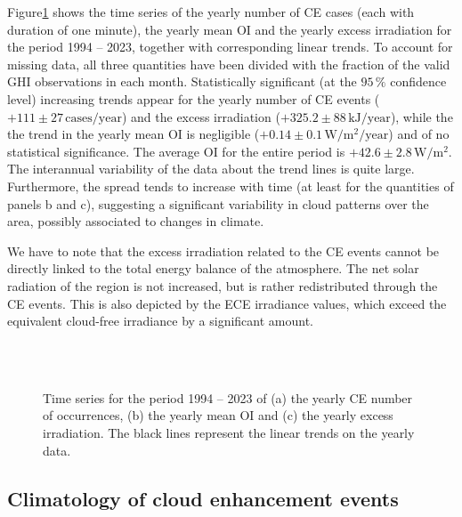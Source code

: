 \documentclass[preprint, 5p,
authoryear]{elsarticle} %
\begin{document}
Figure\nobreakspace{}\ref{fig:P-energy} shows the time series of the
yearly number of CE cases (each with duration of one minute), the yearly
mean OI and the yearly excess irradiation for the period 1994 -- 2023,
together with corresponding linear trends. To account for missing data,
all three quantities have been divided with the fraction of the valid
GHI observations in each month. Statistically significant (at the
\(95\,\%\) confidence level) increasing trends appear for the yearly
number of CE events (\(+111\pm 27\,\text{cases}/\text{year}\)) and the
excess irradiation (\(+325.2 \pm 88\,\text{kJ}/\text{year}\)), while the
the trend in the yearly mean OI is negligible
(\(+0.14\pm 0.1\,\text{W}/\text{m}^2/\text{year}\)) and of no
statistical significance. The average OI for the entire period is
\(+42.6\pm 2.8\,\text{W}/\text{m}^2\). The interannual variability of
the data about the trend lines is quite large. Furthermore, the spread
tends to increase with time (at least for the quantities of panels b and
c), suggesting a significant variability in cloud patterns over the
area, possibly associated to changes in climate.

We have to note that the excess irradiation related to the CE events
cannot be directly linked to the total energy balance of the atmosphere.
The net solar radiation of the region is not increased, but is rather
redistributed through the CE events. This is also depicted by the ECE
irradiance values, which exceed the equivalent cloud-free irradiance by
a significant amount.

\begin{figure}%
        {\centering 
            \\
            \\
        }
    \caption{Time series for the period 1994 -- 2023 of (a) the yearly CE number of occurrences, (b) the yearly mean OI and (c) the yearly excess irradiation. The black lines represent the linear trends on the yearly data.}\label{fig:P-energy}
\end{figure}

\hypertarget{climatology-of-cloud-enhancement-events}{%
\subsection{Climatology of cloud enhancement
events}\label{climatology-of-cloud-enhancement-events}}
\end{document}
